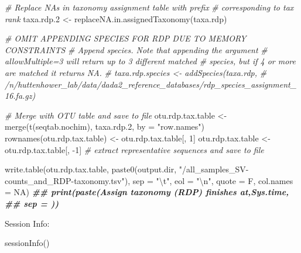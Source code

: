 \documentclass[
]{article}
\newenvironment{Shaded}{\begin{snugshade}}{\end{snugshade}}
\newcommand{\AttributeTok}[1]{\textcolor[rgb]{0.77,0.63,0.00}{#1}}
\newcommand{\CommentTok}[1]{\textcolor[rgb]{0.56,0.35,0.01}{\textit{#1}}}
\newcommand{\ConstantTok}[1]{\textcolor[rgb]{0.00,0.00,0.00}{#1}}
\newcommand{\DecValTok}[1]{\textcolor[rgb]{0.00,0.00,0.81}{#1}}
\newcommand{\DocumentationTok}[1]{\textcolor[rgb]{0.56,0.35,0.01}{\textbf{\textit{#1}}}}
\newcommand{\FloatTok}[1]{\textcolor[rgb]{0.00,0.00,0.81}{#1}}
\newcommand{\FunctionTok}[1]{\textcolor[rgb]{0.00,0.00,0.00}{#1}}
\newcommand{\NormalTok}[1]{#1}
\newcommand{\OtherTok}[1]{\textcolor[rgb]{0.56,0.35,0.01}{#1}}
\newcommand{\SpecialCharTok}[1]{\textcolor[rgb]{0.00,0.00,0.00}{#1}}
\newcommand{\StringTok}[1]{\textcolor[rgb]{0.31,0.60,0.02}{#1}}
\begin{document}
\begin{Shaded}
\begin{Highlighting}[]
\CommentTok{\# Replace NAs in taxonomy assignment table with prefix}
\CommentTok{\# corresponding to tax rank}
\NormalTok{taxa.rdp}\FloatTok{.2} \OtherTok{\textless{}{-}} \FunctionTok{replaceNA.in.assignedTaxonomy}\NormalTok{(taxa.rdp)}

\CommentTok{\# OMIT APPENDING SPECIES FOR RDP DUE TO MEMORY CONSTRAINTS}
\CommentTok{\# Append species. Note that appending the argument}
\CommentTok{\# \textquotesingle{}allowMultiple=3\textquotesingle{} will return up to 3 different matched}
\CommentTok{\# species, but if 4 or more are matched it returns NA.}
\CommentTok{\# taxa.rdp.species \textless{}{-} addSpecies(taxa.rdp,}
\CommentTok{\# \textquotesingle{}/n/huttenhower\_lab/data/dada2\_reference\_databases/rdp\_species\_assignment\_16.fa.gz\textquotesingle{})}


\CommentTok{\# Merge with OTU table and save to file}
\NormalTok{otu.rdp.tax.table }\OtherTok{\textless{}{-}} \FunctionTok{merge}\NormalTok{(}\FunctionTok{t}\NormalTok{(seqtab.nochim), taxa.rdp}\FloatTok{.2}\NormalTok{, }\AttributeTok{by =} \StringTok{"row.names"}\NormalTok{)}
\FunctionTok{rownames}\NormalTok{(otu.rdp.tax.table) }\OtherTok{\textless{}{-}}\NormalTok{ otu.rdp.tax.table[, }\DecValTok{1}\NormalTok{]}
\NormalTok{otu.rdp.tax.table }\OtherTok{\textless{}{-}}\NormalTok{ otu.rdp.tax.table[, }\SpecialCharTok{{-}}\DecValTok{1}\NormalTok{]}
\CommentTok{\# extract representative sequences and save to file}

\FunctionTok{write.table}\NormalTok{(otu.rdp.tax.table, }\FunctionTok{paste0}\NormalTok{(output.dir, }\StringTok{"/all\_samples\_SV{-}counts\_and\_RDP{-}taxonomy.tsv"}\NormalTok{), }
    \AttributeTok{sep =} \StringTok{"}\SpecialCharTok{\textbackslash{}t}\StringTok{"}\NormalTok{, }\AttributeTok{eol =} \StringTok{"}\SpecialCharTok{\textbackslash{}n}\StringTok{"}\NormalTok{, }\AttributeTok{quote =}\NormalTok{ F, }\AttributeTok{col.names =} \ConstantTok{NA}\NormalTok{)}
\DocumentationTok{\#\# print(paste(\textquotesingle{}Assign taxonomy (RDP) finishes at\textquotesingle{},Sys.time,}
\DocumentationTok{\#\# sep = \textquotesingle{} \textquotesingle{}))}
\end{Highlighting}
\end{Shaded}

\newpage

Session Info:

\begin{Shaded}
\begin{Highlighting}[]
\FunctionTok{sessionInfo}\NormalTok{()}
\end{Highlighting}
\end{Shaded}
\end{document}
